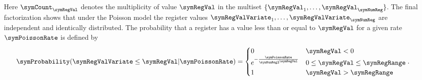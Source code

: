 \documentclass[a4paper]{scrartcl}
\begin{document}
Here $\symCount_\symRegVal$ denotes the multiplicity of value $\symRegVal$  in the multiset $\lbrace\symRegVal_1,\ldots,\symRegVal_\symNumReg\rbrace$.
The final factorization shows that under the Poisson model the register values $\symRegValVariate_1,\ldots,\symRegValVariate_\symNumReg$ are independent and identically distributed. The probability that a register has a value less than or equal to $\symRegVal$ for a given rate $\symPoissonRate$ is defined by
\begin{equation}
\label{equ:register_value_distribution}
\symProbability(\symRegValVariate \leq \symRegVal\vert\symPoissonRate)
=
\begin{cases}
0 & \symRegVal < 0 \\
e^{-\frac{\symPoissonRate}{\symNumReg 2^\symRegVal}} & 0\leq \symRegVal \leq \symRegRange \\
1 & \symRegVal > \symRegRange
\end{cases}.
\end{equation}
\end{document}
